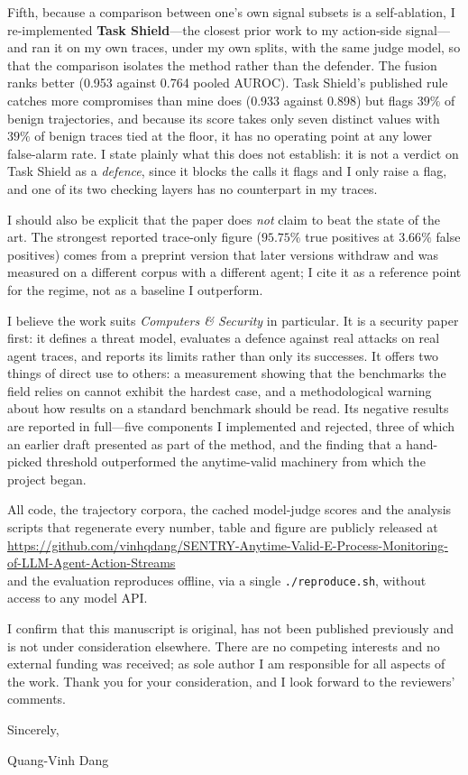 \documentclass[10pt]{article}
\begin{document}
Fifth, because a comparison between one's own signal subsets is a self-ablation, I
re-implemented \textbf{Task Shield}---the closest prior work to my action-side
signal---and ran it on my own traces, under my own splits, with the same judge
model, so that the comparison isolates the method rather than the defender. The
fusion ranks better (0.953 against 0.764 pooled AUROC). Task Shield's published
rule catches more compromises than mine does (0.933 against 0.898) but flags $39\%$
of benign trajectories, and because its score takes only seven distinct values with
$39\%$ of benign traces tied at the floor, it has no operating point at any lower
false-alarm rate. I state plainly what this does not establish: it is not a verdict
on Task Shield as a \emph{defence}, since it blocks the calls it flags and I only
raise a flag, and one of its two checking layers has no counterpart in my traces.

I should also be explicit that the paper does \emph{not} claim to beat the state of
the art. The strongest reported trace-only figure ($95.75\%$ true positives at
$3.66\%$ false positives) comes from a preprint version that later versions
withdraw and was measured on a different corpus with a different agent; I cite it
as a reference point for the regime, not as a baseline I outperform.

I believe the work suits \emph{Computers \& Security} in particular. It is a
security paper first: it defines a threat model, evaluates a defence against real
attacks on real agent traces, and reports its limits rather than only its
successes. It offers two things of direct use to others: a measurement showing that
the benchmarks the field relies on cannot exhibit the hardest case, and a
methodological warning about how results on a standard benchmark should be read.
Its negative results are reported in full---five components I implemented and
rejected, three of which an earlier draft presented as part of the method, and the
finding that a hand-picked threshold outperformed the anytime-valid machinery from
which the project began.

All code, the trajectory corpora, the cached model-judge scores and the analysis
scripts that regenerate every number, table and figure are publicly released at\\
\url{https://github.com/vinhqdang/SENTRY-Anytime-Valid-E-Process-Monitoring-of-LLM-Agent-Action-Streams}\\
and the evaluation reproduces offline, via a single \texttt{./reproduce.sh}, without
access to any model API.

I confirm that this manuscript is original, has not been published previously and
is not under consideration elsewhere. There are no competing interests and no
external funding was received; as sole author I am responsible for all aspects of
the work. Thank you for your consideration, and I look forward to the reviewers'
comments.

\vspace{0.6em}
\noindent Sincerely,

\vspace{0.4em}
\noindent Quang-Vinh Dang
\end{document}
